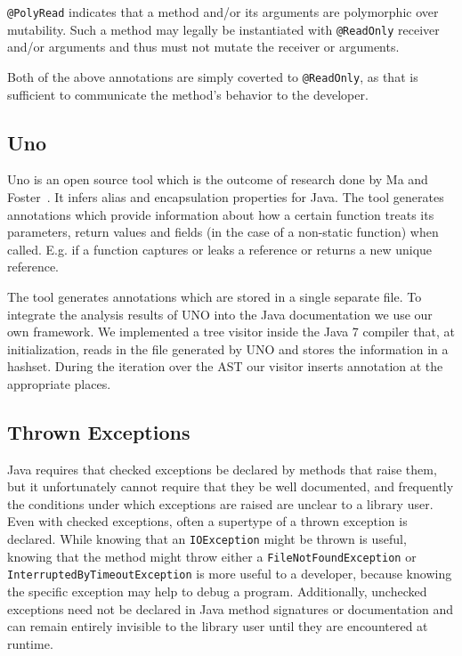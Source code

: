 \texttt{@PolyRead} indicates that a method and/or its arguments are polymorphic
over mutability. Such a method may legally be instantiated with
\texttt{@ReadOnly} receiver and/or arguments and thus must not mutate the
receiver or arguments.

Both of the above annotations are simply coverted to \texttt{@ReadOnly}, as
that is sufficient to communicate the method's behavior to the developer.

\subsection{Uno}

Uno is an open source tool which is the outcome of research done by Ma and
Foster~\cite{Uno}. It infers alias and encapsulation properties for Java.  The
tool generates annotations which provide information about how a certain
function treats its parameters, return values and fields (in the case of a
non-static function) when called. E.g. if a function captures or leaks a
reference or returns a new unique reference.

The tool generates annotations which are stored in a single separate file. 
To integrate the analysis results of UNO into the Java documentation we
use our own framework. We implemented a tree visitor inside the Java 7 
compiler that, at initialization, reads in the file generated by UNO and 
stores the information in a hashset. During the iteration over the AST
our visitor inserts annotation at the appropriate places.

\subsection{Thrown Exceptions}

Java requires that checked exceptions be declared by methods that raise them,
but it unfortunately cannot require that they be well documented, and
frequently the conditions under which exceptions are raised are unclear to a
library user. Even with checked exceptions, often a supertype of a thrown
exception is declared.  While knowing that an \texttt{IOException} might be
thrown is useful, knowing that the method might throw either a
\texttt{FileNotFoundException} or \texttt{InterruptedByTimeoutException} is more
useful to a developer, because knowing the specific exception may help to debug
a program.  Additionally, unchecked exceptions need not be declared in Java method
signatures or documentation and can remain entirely invisible to the library
user until they are encountered at runtime.

